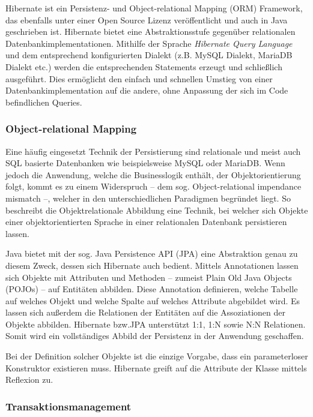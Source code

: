 			Hibernate ist ein Persistenz- und Object-relational Mapping (\ac{ORM}) Framework, das ebenfalls unter einer Open Source Lizenz veröffentlicht und auch in Java geschrieben ist. Hibernate bietet eine Abstraktionsstufe gegenüber relationalen Datenbankimplementationen. Mithilfe der Sprache \textit{Hibernate Query Language} und dem entsprechend konfigurierten Dialekt (z.B. MySQL Dialekt, MariaDB Dialekt etc.) werden die entsprechenden Statements erzeugt und schließlich ausgeführt. Dies ermöglicht den einfach und schnellen Umstieg von einer Datenbankimplementation auf die andere, ohne Anpassung der sich im Code befindlichen Queries. 
			
			\subsubsection{Object-relational Mapping} %
		
				Eine häufig eingesetzt Technik der Persistierung sind relationale und meist auch \ac{SQL} basierte Datenbanken wie beispielsweise MySQL oder MariaDB. Wenn jedoch die Anwendung, welche die Businesslogik enthält, der Objektorientierung folgt, kommt es zu einem Widerspruch -- dem sog. Object-relational impendance mismatch --, welcher in den unterschiedlichen Paradigmen begründet liegt. So beschreibt die Objektrelationale Abbildung eine Technik, bei welcher sich Objekte einer objektorientierten Sprache in einer relationalen Datenbank persistieren lassen. 
					
				Java bietet mit der sog. Java Persistence API (\ac{JPA}) eine Abstraktion genau zu diesem Zweck, dessen sich Hibernate auch bedient. Mittels Annotationen lassen sich Objekte mit Attributen und Methoden -- zumeist Plain Old Java Objects (\ac{POJO}s) -- auf Entitäten abbilden. Diese Annotation definieren, welche Tabelle auf welches Objekt und welche Spalte auf welches Attribute abgebildet wird. Es lassen sich außerdem die Relationen der Entitäten auf die Assoziationen der Objekte abbilden. Hibernate bzw.\ac{JPA} unterstützt 1:1, 1:N sowie N:N Relationen. Somit wird ein vollständiges Abbild der Persistenz in der Anwendung geschaffen.
				
				Bei der Definition solcher Objekte ist die einzige Vorgabe, dass ein parameterloser Konstruktor existieren muss. Hibernate greift auf die Attribute der Klasse mittels Reflexion zu. 
				
			\subsubsection{Transaktionsmanagement} %
			
